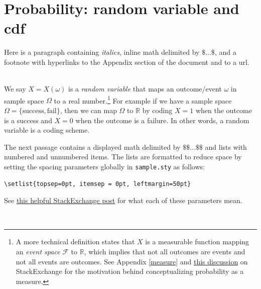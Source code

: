 \documentclass[12pt, notitlepage]{article}
\begin{document}
\section{Probability: random variable and cdf}

\begin{notes}
Here is a paragraph containing \textit{italics}, inline math delimited by $\texttt{\$ \ldots \$}$, and a footnote with hyperlinks to the Appendix section of the document and to a url. 
\end{notes}
\\

We say $X = X(\omega)$ is a \textit{random variable} that maps an outcome/event $\omega$ in sample space $\Omega$ to a real number.\footnote{A more technical definition states that $X$ is a measurable function mapping an \textit{event space} $\mathcal{F}$ to $\mathbb{R}$, which implies that not all outcomes are events and not all events are outcomes. See Appendix \ref{measure} and \href{https://stats.stackexchange.com/questions/199280/why-do-we-need-sigma-algebras-to-define-probability-spaces}{this discussion} on StackExchange for the motivation behind conceptualizing probability as a measure.} For example if we have a sample space $\Omega = \{ \text{success}, \text{fail} \}$, then we can map $\Omega$ to $\mathbb{R}$ by coding $X = 1$ when the outcome is a success and $X=0$ when the outcome is a failure. In other words, a random variable is a coding scheme.



\begin{notes}
The next passage contains a displayed math delimited by \texttt{$\$\$ \ldots \$\$$} and lists with numbered and unnumbered items. The lists are formatted to reduce space by setting the spacing parameters globally in \texttt{sample.sty} as follows:
\begin{verbatim}
\setlist{topsep=0pt, itemsep = 0pt, leftmargin=50pt}
\end{verbatim}
See \href{https://tex.stackexchange.com/a/300512}{this helpful StackExchange post} for what each of these parameters mean.
\end{notes}
\\
\end{document}
